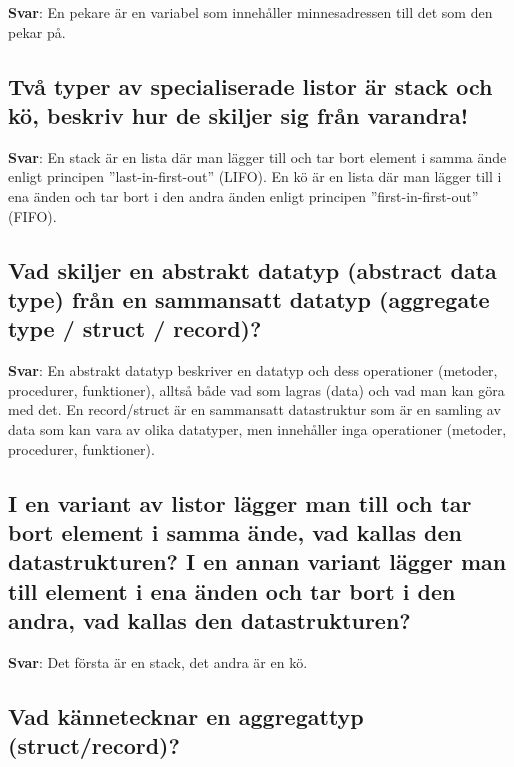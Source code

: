 \documentclass[a4paper,11pt,oneside]{article}
\begin{document}
\begin{sloppypar}
\label{q:263:sa:sv:True}

\textbf{Svar}: En pekare \"ar en variabel som inneh\r{a}ller minnesadressen till det som den pekar p\r{a}.



\subsection{Tv\r{a} typer av specialiserade listor \"ar stack och k\"o, beskriv hur de skiljer sig fr\r{a}n varandra!}

\label{q:264:sa:sv:True}

\textbf{Svar}: En stack \"ar en lista d\"ar man l\"agger till och tar bort element i samma \"ande enligt principen {\textquotedblright}last-in-first-out{\textquotedblright} (LIFO). En k\"o \"ar en lista d\"ar man l\"agger till i ena \"anden och tar bort i den andra \"anden enligt principen {\textquotedblright}first-in-first-out{\textquotedblright} (FIFO).



\subsection{Vad skiljer en abstrakt datatyp (abstract data type) fr\r{a}n en sammansatt datatyp (aggregate type / struct / record)?}

\label{q:265:sa:sv:True}

\textbf{Svar}: En abstrakt datatyp beskriver en datatyp och dess operationer (metoder, procedurer, funktioner), allts\r{a} b\r{a}de vad som lagras (data) och vad man kan g\"ora med det. En record/struct \"ar en sammansatt datastruktur som \"ar en samling av data som kan vara av olika datatyper, men inneh\r{a}ller inga operationer (metoder, procedurer, funktioner).



\subsection{I en variant av listor l\"agger man till och tar bort element i samma \"ande, vad kallas den datastrukturen? I en annan variant l\"agger man till element i ena \"anden och tar bort i den andra, vad kallas den datastrukturen?}

\label{q:266:sa:sv:True}

\textbf{Svar}: Det f\"orsta \"ar en stack, det andra \"ar en k\"o.



\subsection{Vad k\"annetecknar en aggregattyp (struct/record)?}


\end{sloppypar}
\end{document}
